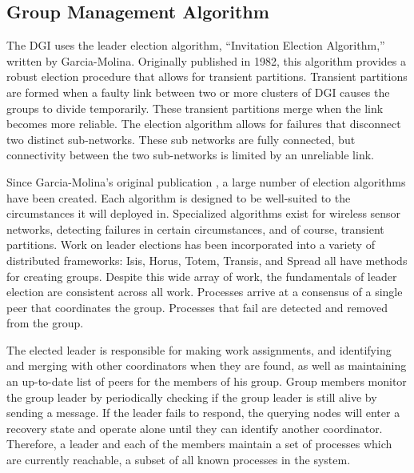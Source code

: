 \subsection{Group Management Algorithm}

The DGI uses the leader election algorithm, ``Invitation Election Algorithm,'' written by Garcia-Molina\cite{INVITATIONELECTION}.
Originally published in 1982, this algorithm provides a robust election  procedure that allows for transient partitions.
Transient partitions are formed when a faulty link between two or more clusters of \ac{DGI} causes the groups to divide temporarily.
These transient partitions merge when the link becomes more reliable.
The election algorithm allows for failures that disconnect two distinct sub-networks.
These sub networks are fully connected, but connectivity between the two sub-networks is limited by an unreliable link.

Since Garcia-Molina's original publication \cite{INVITATIONELECTION}, a large number of election algorithms have been created. 
Each algorithm is designed to be well-suited to the circumstances it will deployed in.
Specialized algorithms exist for wireless sensor networks\cite{LE-WSN-1}\cite{LE-WSN-2}, detecting failures in certain circumstances\cite{LE-SPECIALCIRCUMSTANCES-1}\cite{LE-SPECIALCIRCUMSTANCES-2}, and of course, transient partitions.
Work on leader elections has been incorporated into a variety of distributed frameworks: Isis\cite{ISISTOOLKIT}, Horus\cite{HORUSTOOLKIT}, Totem\cite{TOTEMTOOLKIT}, Transis\cite{TRANSISTOOLKIT}, and Spread\cite{SPREADTOOLKIT} all have methods for creating groups.
Despite this wide array of work, the fundamentals of leader election are consistent
across all work.
Processes arrive at a consensus of a single peer that coordinates the group.
Processes that fail are detected and removed from the group. 

The elected leader is responsible for making work assignments, and identifying and merging with other coordinators when they are found, as well as maintaining an up-to-date list of peers for the members of his group. 
Group members monitor the group leader by periodically checking if the group leader is still alive by sending a message. 
If the leader fails to respond, the querying nodes will enter a recovery state and operate alone until
they can identify another coordinator.
Therefore, a leader and each of the members maintain a set of processes which are currently reachable, a subset of all known processes in the system.

